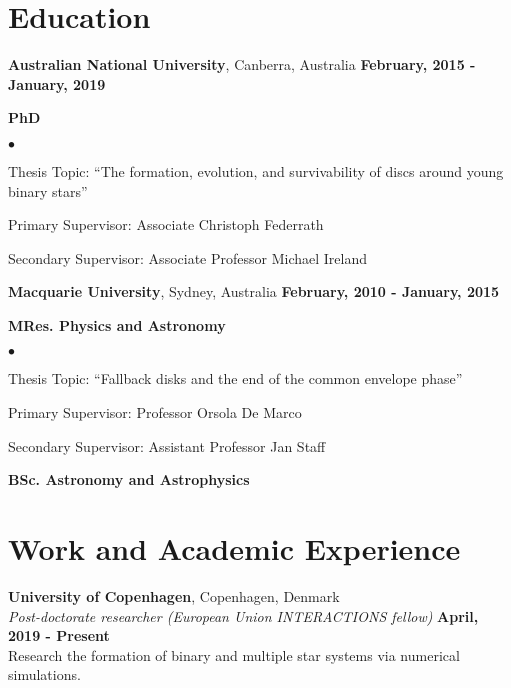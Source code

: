 \documentclass[margin,line]{res}
\newenvironment{list1}{
	\begin{list}{\ding{113}}{%
			\setlength{\itemsep}{0in}
			\setlength{\parsep}{0in} \setlength{\parskip}{0in}
			\setlength{\topsep}{0in} \setlength{\partopsep}{0in} 
			\setlength{\leftmargin}{0.17in}}}{\end{list}}
\newenvironment{list2}{
	\begin{list}{$\bullet$}{%
			\setlength{\itemsep}{0in}
			\setlength{\parsep}{0in} \setlength{\parskip}{0in}
			\setlength{\topsep}{0in} \setlength{\partopsep}{0in} 
			\setlength{\leftmargin}{0.2in}}}{\end{list}}
\begin{document}
\begin{resume}
		\section{\sc Education}
		{\bf Australian National University}, Canberra, Australia \hfill {\bf February, 2015 - January, 2019}\\
		\vspace*{-.1in}
		\begin{list1}
			\item[] {\bf PhD}
			\begin{list2}
				\vspace*{.05in}
				\item Thesis Topic:  ``The formation, evolution, and survivability of discs around young binary stars'' 
				\item Primary Supervisor: Associate Christoph Federrath
				\item Secondary Supervisor: Associate Professor Michael Ireland
			\end{list2}
		\end{list1}
		{\bf Macquarie University}, Sydney, Australia \hfill {\bf February, 2010 - January, 2015}\\ 
		\vspace*{-.1in}
		\begin{list1}
			\item[] {\bf MRes. Physics and Astronomy}
			\begin{list2}
				\vspace*{.05in}
				\item Thesis Topic:  ``Fallback disks and the end of the common envelope phase'' 
				\item Primary Supervisor:  Professor Orsola De Marco
				\item Secondary Supervisor: Assistant Professor Jan Staff
			\end{list2}
			\vspace*{.05in}
			\item[] {\bf BSc. Astronomy and Astrophysics}
		\end{list1}
		
		\section{\sc Work and Academic Experience}
		{\bf University of Copenhagen}, Copenhagen, Denmark\\
		{\em Post-doctorate researcher (European Union INTERACTIONS fellow)} \hfill {\bf April, 2019 - Present}\\
		Research the formation of binary and multiple star systems via numerical simulations.\\
		

\end{resume}
\end{document}

